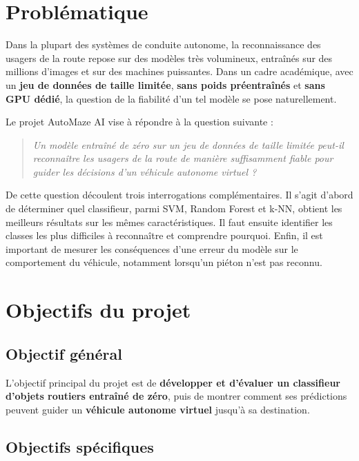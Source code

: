\section{Problématique}

Dans la plupart des systèmes de conduite autonome, la reconnaissance des usagers de la route repose sur des modèles très volumineux, entraînés sur des millions d'images et sur des machines puissantes. Dans un cadre académique, avec un \textbf{jeu de données de taille limitée}, \textbf{sans poids préentraînés} et \textbf{sans GPU dédié}, la question de la fiabilité d'un tel modèle se pose naturellement.

Le projet AutoMaze AI vise à répondre à la question suivante :

\begin{quote}
\itshape Un modèle entraîné de zéro sur un jeu de données de taille limitée peut-il reconnaître les usagers de la route de manière suffisamment fiable pour guider les décisions d'un véhicule autonome virtuel ?
\end{quote}

De cette question découlent trois interrogations complémentaires. Il s'agit d'abord de déterminer quel classifieur, parmi SVM, Random Forest et k-NN, obtient les meilleurs résultats sur les mêmes caractéristiques. Il faut ensuite identifier les classes les plus difficiles à reconnaître et comprendre pourquoi. Enfin, il est important de mesurer les conséquences d'une erreur du modèle sur le comportement du véhicule, notamment lorsqu'un piéton n'est pas reconnu.

\section{Objectifs du projet}

\subsection{Objectif général}

L'objectif principal du projet est de \textbf{développer et d'évaluer un classifieur d'objets routiers entraîné de zéro}, puis de montrer comment ses prédictions peuvent guider un \textbf{véhicule autonome virtuel} jusqu'à sa destination.

\subsection{Objectifs spécifiques}


